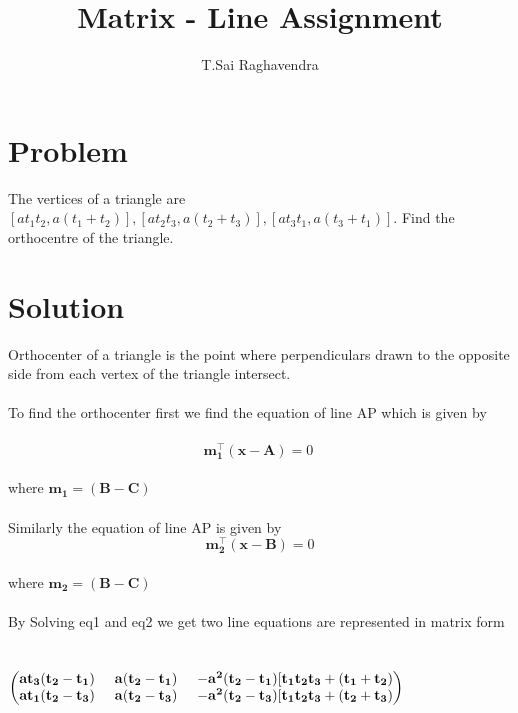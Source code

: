 \documentclass[journal,12pt,twocolumn]{IEEEtran}
\title{\mytitle}
\title{
Matrix - Line Assignment
}
\author{T.Sai Raghavendra}
\newcommand{\myvec}[1]{\ensuremath{\begin{pmatrix}#1\end{pmatrix}}}
\let\vec\mathbf
\begin{document}
\maketitle
\tableofcontents
\bigskip


\section{\textbf{Problem}}
The vertices of a triangle are $ [at_1t_2,a(t_1+t_2)],[at_2t_3,a(t_2+t_3)],[at_3t_1,a(t_3+t_1)] $. Find the orthocentre of the triangle.\\


\section{\textbf{Solution}}
Orthocenter of a triangle is the point where perpendiculars drawn to the opposite side from each vertex of the triangle intersect.   \\
\\
To find the orthocenter first we find the equation of line AP which is given by\\
\\
\begin{equation}
 \vec{m_1^{\top}}(\vec{{x}-{A}}) = 0   \ 
\end{equation}
\\
where $\vec{m_1} = \vec{(B-C)}$ \\
\\Similarly the equation of line AP is given by
\\
\begin{equation}
 \vec{m_2^{\top}}(\vec{{x}-B}) = 0   \label{eq-3}
\end{equation}
\\
where $\vec{m_2} = \vec{(B-C)}$ 
\\
\\
 By Solving eq1 and eq2 we get two line equations are represented in matrix form 
\\
\\
\\
\myvec{\vec{{at_3(t_2-t_1)\hspace{0.5cm}{a(t_2-t_1) \hspace{0.5cm} {-a^2(t_2-t_1)[t_1t_2t_3 + (t_1+t_2) }}}} \\ \vec{{at_1(t_2-t_3)\hspace{0.5cm}{a(t_2-t_3) \hspace{0.5cm} {-a^2(t_2-t_3)[t_1t_2t_3 + (t_2+t_3) }}}}}
\\
\end{document}
